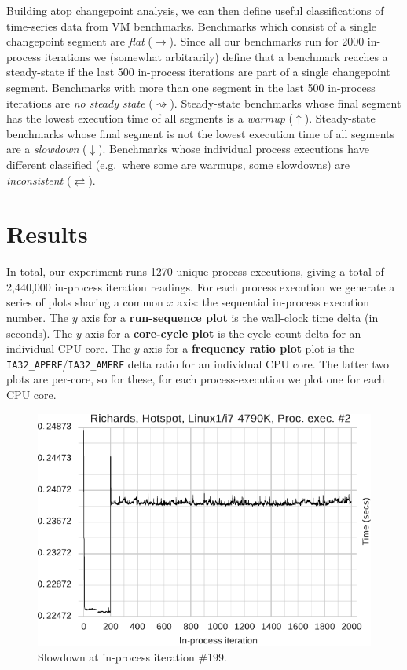 \documentclass[preprint,numbers,10pt]{sigplanconf}
\begin{document}
Building atop changepoint analysis, we can then define useful classifications of
time-series data from VM benchmarks. Benchmarks which consist of a
single changepoint segment are \emph{flat} ($\rightarrow$). Since all our benchmarks run for 2000
in-process iterations we (somewhat arbitrarily) define that a benchmark reaches
a steady-state if the last 500 in-process iterations are part of a single
changepoint segment. Benchmarks with more than one segment in the last 500
in-process iterations are \emph{no steady state} ($\rightsquigarrow$). Steady-state
benchmarks whose final segment has the lowest execution time of all segments is
a \emph{warmup} ($\uparrow$). Steady-state benchmarks whose final segment is not
the lowest execution time of all segments are a \emph{slowdown} ($\downarrow$).
Benchmarks whose individual process executions have different classified
(e.g.~where some are warmups, some slowdowns) are \emph{inconsistent}
($\rightleftarrows$).


\section{Results}
\label{sec:Results}

%

In total, our experiment runs  1270 unique process executions, giving a total
of 2,440,000 in-process iteration readings.
For each process execution we generate a series of plots sharing a common $x$
axis: the sequential in-process execution number. The $y$ axis for a
\textbf{run-sequence plot} is the wall-clock time delta (in seconds). The $y$
axis for a \textbf{core-cycle plot} is the cycle count delta for an individual
CPU core. The $y$ axis for a \textbf{frequency ratio plot} plot is the
\texttt{IA32\_APERF}/\texttt{IA32\_AMERF} delta ratio for an individual CPU
core. The latter two plots are per-core, so for these, for each
process-execution we plot one for each CPU core.

\begin{figure}[tbp]
\centering
\includegraphics[width=.45\textwidth]{examples/new_slowdown.pdf}
\caption{Slowdown at in-process iteration \#199.}
\label{fig:examples:slowdown1}
\end{figure}
\end{document}
